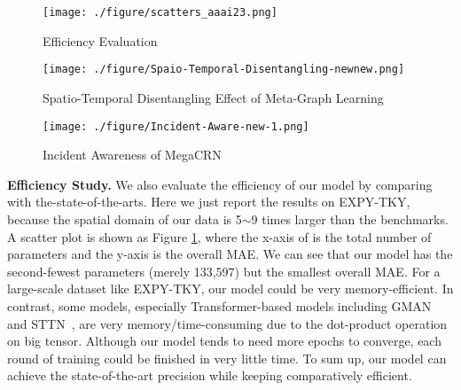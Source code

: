 \documentclass[letterpaper]{article} \usepackage{aaai23}  \usepackage{times}  \usepackage{helvet}  \usepackage{courier}  \usepackage[hyphens]{url}  \usepackage{graphicx} \urlstyle{rm} \def\UrlFont{\rm}  \usepackage{natbib}  \usepackage{caption} \usepackage{multirow}
\begin{document}
\begin{figure}[h]
	\centering
	\texttt{[image: ./figure/scatters\_aaai23.png]}
	\caption{Efficiency Evaluation}
	\label{fig:efficiency}
\end{figure}
\begin{figure*}[h]
	\centering
	\texttt{[image: ./figure/Spaio-Temporal-Disentangling-newnew.png]}
	\caption{Spatio-Temporal Disentangling Effect of Meta-Graph Learning}
	\label{fig:case-distangle}
\end{figure*}
\begin{figure*}[h]
	\centering
	\texttt{[image: ./figure/Incident-Aware-new-1.png]}
	\caption{Incident Awareness of MegaCRN}
	\label{fig:case-incident}
\end{figure*}

\noindent\textbf{Efficiency Study.} We also evaluate the efficiency of our model by comparing with the-state-of-the-arts. Here we just report the results on EXPY-TKY, because the spatial domain of our data is 5$\sim$9 times larger than the benchmarks. A scatter plot is shown as Figure \ref{fig:efficiency}, where the x-axis of is the total number of parameters and the y-axis is the overall MAE. We can see that our model has the second-fewest parameters (merely 133,597) but the smallest overall MAE. For a large-scale dataset like EXPY-TKY, our model could be very memory-efficient. In contrast, some models, especially Transformer-based models including GMAN~\cite{zheng2020gman} and STTN~\cite{xu2020spatial}, are very memory/time-consuming due to the dot-product operation on big tensor. Although our model tends to need more epochs to converge, each round of training could be finished in very little time. To sum up, our model can achieve the state-of-the-art precision while keeping comparatively efficient.
\end{document}
